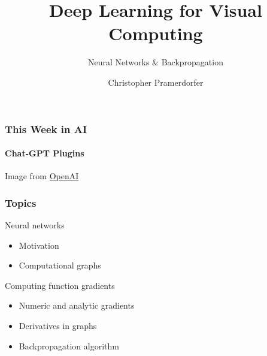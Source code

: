 \documentclass[xetex,professionalfont]{beamer}
\title{Deep Learning for Visual Computing}
\subtitle{Neural Networks \& Backpropagation}
\author{Christopher Pramerdorfer}
\institute{Computer Vision Lab, TU Wien}
\begin{document}
\begin{frame}
\maketitle
\end{frame}


\begin{frame}
  \frametitle{This Week in AI}
  \framesubtitle{Chat-GPT Plugins}
  
  \begin{center}
    {\centering Image from \href{https://openai.com/}{OpenAI}}
  \end{center}
    
\end{frame}


\begin{frame}
\frametitle{Topics}

Neural networks
\begin{itemize}
    \item Motivation
    \item Computational graphs
\end{itemize}

\bigskip

Computing function gradients
\begin{itemize}
    \item Numeric and analytic gradients
    \item Derivatives in graphs
    \item Backpropagation algorithm
\end{itemize}

\end{frame}
\end{document}

